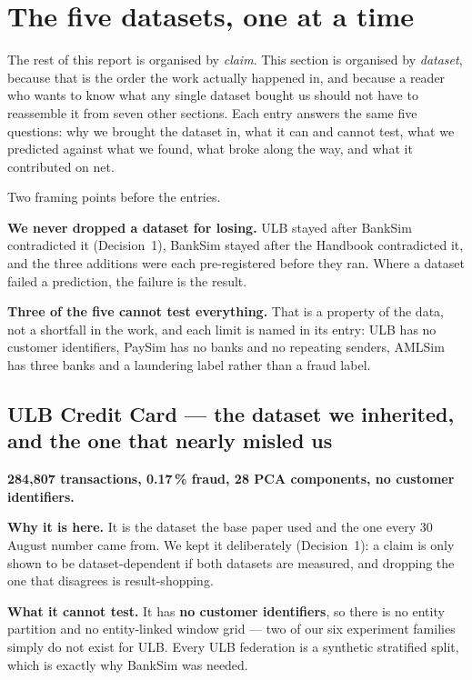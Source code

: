 \documentclass[11pt]{article}
\begin{document}
\section{The five datasets, one at a time}
\label{sec:datasetjourney}

The rest of this report is organised by \emph{claim}. This section is organised by \emph{dataset}, because
that is the order the work actually happened in, and because a reader who wants to know what any single
dataset bought us should not have to reassemble it from seven other sections. Each entry answers the same
five questions: why we brought the dataset in, what it can and cannot test, what we predicted against what
we found, what broke along the way, and what it contributed on net.

Two framing points before the entries.

\textbf{We never dropped a dataset for losing.} ULB stayed after BankSim contradicted it (Decision~1),
BankSim stayed after the Handbook contradicted it, and the three additions were each pre-registered before
they ran. Where a dataset failed a prediction, the failure is the result.

\textbf{Three of the five cannot test everything.} That is a property of the data, not a shortfall in the
work, and each limit is named in its entry: ULB has no customer identifiers, PaySim has no banks and no
repeating senders, AMLSim has three banks and a laundering label rather than a fraud label.

\subsection{ULB Credit Card --- the dataset we inherited, and the one that nearly misled us}

\textbf{284{,}807 transactions, 0.17\,\% fraud, 28 PCA components, no customer identifiers.}

\textbf{Why it is here.} It is the dataset the base paper used and the one every 30 August number came
from. We kept it deliberately (Decision~1): a claim is only shown to be dataset-dependent if both datasets
are measured, and dropping the one that disagrees is result-shopping.

\textbf{What it cannot test.} It has \textbf{no customer identifiers}, so there is no entity partition and
no entity-linked window grid --- two of our six experiment families simply do not exist for ULB. Every ULB
federation is a synthetic stratified split, which is exactly why BankSim was needed.
\end{document}

